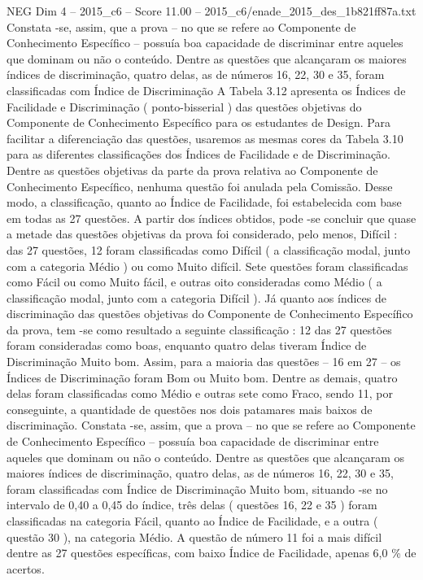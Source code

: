 \begin{textsample}{NEG Dim 4 – 2015\_c6 – Score 11.00 – 2015\_c6/enade\_2015\_des\_1b821ff87a.txt}
Constata -se, assim, que a prova – no que se refere ao Componente de Conhecimento Específico – possuía boa capacidade de discriminar entre aqueles que dominam ou não o conteúdo.
Dentre as questões que alcançaram os maiores índices de discriminação, quatro delas, as de números 16, 22, 30 e 35, foram classificadas com Índice de Discriminação A Tabela 3.12 apresenta os Índices de Facilidade e Discriminação ( ponto-bisserial ) das questões objetivas do Componente de Conhecimento Específico para os estudantes de Design.
Para facilitar a diferenciação das questões, usaremos as mesmas cores da Tabela 3.10 para as diferentes classificações dos Índices de Facilidade e de Discriminação.
Dentre as questões objetivas da parte da prova relativa ao Componente de Conhecimento Específico, nenhuma questão foi anulada pela Comissão.
Desse modo, a classificação, quanto ao Índice de Facilidade, foi estabelecida com base em todas as 27 questões.
A partir dos índices obtidos, pode -se concluir que quase a metade das questões objetivas da prova foi considerado, pelo menos, Difícil : das 27 questões, 12 foram classificadas como Difícil ( a classificação modal, junto com a categoria Médio ) ou como Muito difícil.
Sete questões foram classificadas como Fácil ou como Muito fácil, e outras oito consideradas como Médio ( a classificação modal, junto com a categoria Difícil ).
Já quanto aos índices de discriminação das questões objetivas do Componente de Conhecimento Específico da prova, tem -se como resultado a seguinte classificação : 12 das 27 questões foram consideradas como boas, enquanto quatro delas tiveram Índice de Discriminação Muito bom.
Assim, para a maioria das questões – 16 em 27 – os Índices de Discriminação foram Bom ou Muito bom.
Dentre as demais, quatro delas foram classificadas como Médio e outras sete como Fraco, sendo 11, por conseguinte, a quantidade de questões nos dois patamares mais baixos de discriminação.
Constata -se, assim, que a prova – no que se refere ao Componente de Conhecimento Específico – possuía boa capacidade de discriminar entre aqueles que dominam ou não o conteúdo.
Dentre as questões que alcançaram os maiores índices de discriminação, quatro delas, as de números 16, 22, 30 e 35, foram classificadas com Índice de Discriminação Muito bom, situando -se no intervalo de 0,40 a 0,45 do índice, três delas ( questões 16, 22 e 35 ) foram classificadas na categoria Fácil, quanto ao Índice de Facilidade, e a outra ( questão 30 ), na categoria Médio.
A questão de número 11 foi a mais difícil dentre as 27 questões específicas, com baixo Índice de Facilidade, apenas 6,0 \% de acertos.

\end{textsample}
